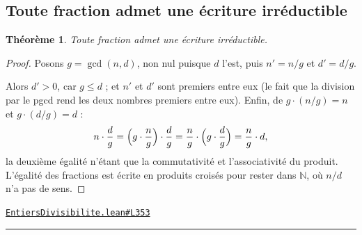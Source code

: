 \documentclass[11pt,a4paper]{article}
\theoremstyle{definition}
\theoremstyle{plain}
\newtheorem{theoreme}{Théorème}
\newcommand{\source}[2]{\par\smallskip\noindent\hfill{\footnotesize\href{#1}{\texttt{#2}}}\par\smallskip}
\begin{document}
\subsection{Toute fraction admet une écriture irréductible}

\begin{theoreme}
Toute fraction admet une écriture irréductible.
\end{theoreme}

\begin{proof}
Posons $g = \gcd(n,d)$, non nul puisque $d$ l'est, puis $n' = n/g$ et $d' = d/g$.

Alors $d' > 0$, car $g \le d$ ; et $n'$ et $d'$ sont premiers entre eux
(le fait que la division par le pgcd rend les deux nombres premiers entre eux). Enfin, de $g \cdot (n/g) = n$ et
$g \cdot (d/g) = d$ :
\[
n \cdot \frac{d}{g}
 = \Bigl(g \cdot \frac{n}{g}\Bigr) \cdot \frac{d}{g}
 = \frac{n}{g} \cdot \Bigl(g \cdot \frac{d}{g}\Bigr)
 = \frac{n}{g} \cdot d ,
\]
la deuxième égalité n'étant que la commutativité et l'associativité du produit. L'égalité
des fractions est écrite en produits croisés pour rester dans $\mathbb{N}$, où $n/d$ n'a
pas de sens.
\end{proof}
\source{https://github.com/Commutator-IO/learn-lean/blob/main/cours/01-college/01-nombres-et-calculs/EntiersDivisibilite.lean\#L353}{EntiersDivisibilite.lean\#L353}

\vfill
\noindent\rule{0.35\linewidth}{0.4pt}\par
{}
\end{document}
